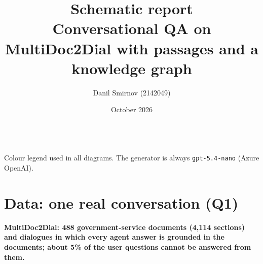 \documentclass[11pt,a4paper]{article}
\title{Schematic report\\[2pt]\large Conversational QA on MultiDoc2Dial with passages and a knowledge graph}
\author{Danil Smirnov (2142049)}
\date{October 2026}
\newcommand{\gen}{\texttt{gpt-5.4-nano}}
\begin{document}
\maketitle

\begin{center}
\\[2pt]
{\small Colour legend used in all diagrams. The generator is always \gen{} (Azure OpenAI).}
\end{center}

\section{Data: one real conversation (Q1)}\label{sec:data}

\textbf{MultiDoc2Dial: 488 government-service documents (4,114 sections) and dialogues in which
every agent answer is grounded in the documents; about 5\% of the user questions cannot be
answered from them.}
\end{document}
